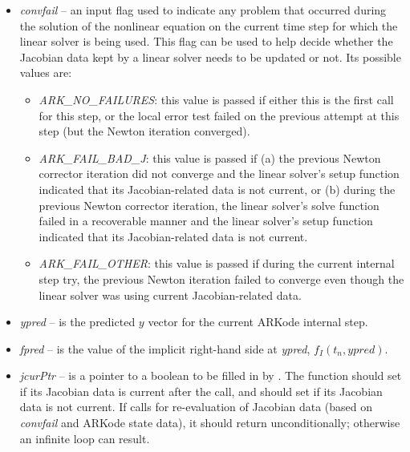 \documentclass[letterpaper,10pt,english]{sphinxmanual}
\begin{document}
\begin{fulllineitems}
\begin{description}
\begin{itemize}
\item {} 
\emph{convfail} -- an input flag used to indicate any problem that
occurred during the solution of the nonlinear equation on the
current time step for which the linear solver is being
used. This flag can be used to help decide whether the
Jacobian data kept by a linear solver needs to be
updated or not. Its possible values are:
\begin{itemize}
\item {} 
\emph{ARK\_NO\_FAILURES}: this value is passed if either this is the
first call for this step, or the local error test failed on
the previous attempt at this step (but the Newton iteration
converged).

\item {} 
\emph{ARK\_FAIL\_BAD\_J}: this value is passed if (a) the previous
Newton corrector iteration did not converge and the linear
solver's setup function indicated that its Jacobian-related
data is not current, or (b) during the previous Newton
corrector iteration, the linear solver's solve function
failed in a recoverable manner and the linear solver's setup
function indicated that its Jacobian-related data is not
current.

\item {} 
\emph{ARK\_FAIL\_OTHER}: this value is passed if during the current
internal step try, the previous Newton iteration failed to
converge even though the linear solver was using current
Jacobian-related data.

\end{itemize}

\item {} 
\emph{ypred} -- is the predicted $y$ vector for the current
ARKode internal step.

\item {} 
\emph{fpred} -- is the value of the implicit right-hand side at
\emph{ypred}, $f_I(t_n,ypred)$.

\item {} 
\emph{jcurPtr} -- is a pointer to a boolean to be filled in by
{\hyperref[linear_solvers/custom:lsetup]{}}. The function should set 
if its Jacobian data is current after the call, and should set
 if its Jacobian data is not current. If
{\hyperref[linear_solvers/custom:lsetup]{}} calls for re-evaluation of Jacobian data
(based on \emph{convfail} and ARKode state data), it should return
 unconditionally; otherwise an infinite
loop can result.


\end{itemize}
\end{description}
\end{fulllineitems}
\end{document}
